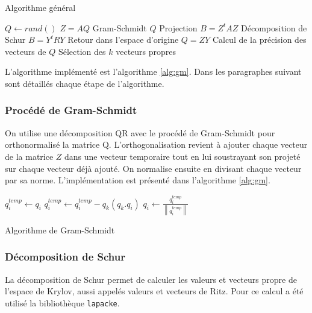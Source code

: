 \documentclass[11pt,a4paper]{article}
\newcommand{\norm}[1]{\left\lVert#1\right\rVert}
\begin{document}
		\begin{algorithm}
			\caption{Algorithme général}
			\label{alg:global}
			\begin{algorithmic}[1]
					\State $Q \gets rand()$
						\State $Z = AQ$
						\State Gram-Schmidt $Q$
						\State Projection $B = Z^tAZ$
						\State Décomposition de Schur $B = Y^tRY$
						\State Retour dans l'espace d'origine $Q = ZY$
						\State Calcul de la précision des vecteurs de $Q$
						\State Sélection des $k$ vecteurs propres
					\EndWhile
				\end{algorithmic}
		\end{algorithm}

		L'algorithme implémenté est l'algorithme \ref{alg:gm}.
		Dans les paragraphes suivant sont détaillés chaque étape de l'algorithme.

		\subsubsection{Procédé de Gram-Schmidt}

		On utilise une décomposition QR avec le procédé de Gram-Schmidt pour orthonormalisé la matrice Q. L'orthogonalisation revient à ajouter chaque vecteur de la matrice $Z$ dans une vecteur temporaire tout en lui soustrayant son projeté sur chaque vecteur déjà ajouté. On normalise ensuite en divisant chaque vecteur par sa norme. L'implémentation est présenté dans l'algorithme \ref{alg:gm}.

			\begin{algorithm}
				\begin{algorithmic}[1]
					\For {$i = 0..m-1$}
						\State $q^{temp}_i \gets q_i$
						\For{$k = 0..i$}
						\State $q^{temp}_i \gets q^{temp}_i - q_k(q_k.q_i)$
						\EndFor
					\EndFor
					\For {$i = 0..m-1$}
						\State $q_i \gets \frac{q_i^{temp}}{\norm{q_i^{temp}}}$
					\EndFor
				\end{algorithmic}
				\caption{Algorithme de Gram-Schmidt}
				\label{alg:gm}
			\end{algorithm}

		\subsubsection{Décomposition de Schur}

		La décomposition de Schur permet de calculer les valeurs et vecteurs propre de l'espace de Krylov, aussi appelés valeurs et vecteurs de Ritz. Pour ce calcul a été utilisé la bibliothèque \texttt{lapacke}.
\end{document}
